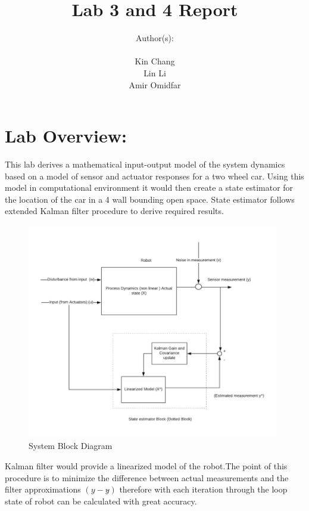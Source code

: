 \documentclass[12pt, letterpaper]{amsart} %
\author{Author(s): \\ \\ Kin Chang \\ 
Lin Li\\Amir Omidfar}
\title{Lab 3 and 4 Report}
\numberwithin{equation}{section}
\begin{document}
\maketitle
\pagebreak
\tableofcontents
\pagebreak
\section*{Lab Overview:}
This lab derives a mathematical input-output model of the system dynamics based on a model of sensor and actuator responses for a two wheel car. Using this model in computational environment it would then create a state estimator for the location of the car in a 4 wall bounding open space. State estimator follows extended Kalman filter procedure to derive required results.



\begin{figure}[h!]
\includegraphics[width=110mm]{fig_1.png}
\caption{System Block Diagram}
\label{fig:figure1}
\end{figure}

Kalman filter would provide a linearized model of the robot.The point of this procedure is to minimize the difference between actual measurements and the filter approximations $(y-y\hat{})$ therefore with each iteration through the loop state of robot can be calculated with great accuracy.   
\\
\newpage
\end{document}
